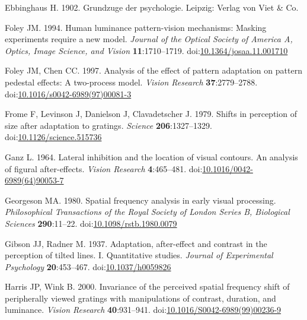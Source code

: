 \documentclass[
]{article}
\newlength{\cslhangindent}
\newlength{\cslentryspacingunit} %
\newenvironment{CSLReferences}[2] %
 {%
  \setlength{\parindent}{0pt}
  \ifodd #1
  \let\oldpar\par
  \def\par{\hangindent=\cslhangindent\oldpar}
  \fi
  \setlength{\parskip}{#2\cslentryspacingunit}
 }%
 {}
\begin{document}
\begin{CSLReferences}{1}{0}
\leavevmode{}%
Ebbinghaus H. 1902. Grundzuge der psychologie. Leipzig: Verlag von Viet \& Co.

\leavevmode{}%
Foley JM. 1994. Human luminance pattern-vision mechanisms: Masking experiments require a new model. \emph{Journal of the Optical Society of America A, Optics, Image Science, and Vision} \textbf{11}:1710--1719. doi:\href{https://doi.org/10.1364/josaa.11.001710}{10.1364/josaa.11.001710}

\leavevmode{}%
Foley JM, Chen CC. 1997. Analysis of the effect of pattern adaptation on pattern pedestal effects: A two-process model. \emph{Vision Research} \textbf{37}:2779--2788. doi:\href{https://doi.org/10.1016/s0042-6989(97)00081-3}{10.1016/s0042-6989(97)00081-3}

\leavevmode{}%
Frome F, Levinson J, Danielson J, Clavadetscher J. 1979. Shifts in perception of size after adaptation to gratings. \emph{Science} \textbf{206}:1327--1329. doi:\href{https://doi.org/10.1126/science.515736}{10.1126/science.515736}

\leavevmode{}%
Ganz L. 1964. Lateral inhibition and the location of visual contours. An analysis of figural after-effects. \emph{Vision Research} \textbf{4}:465--481. doi:\href{https://doi.org/10.1016/0042-6989(64)90053-7}{10.1016/0042-6989(64)90053-7}

\leavevmode{}%
Georgeson MA. 1980. Spatial frequency analysis in early visual processing. \emph{Philosophical Transactions of the Royal Society of London Series B, Biological Sciences} \textbf{290}:11--22. doi:\href{https://doi.org/10.1098/rstb.1980.0079}{10.1098/rstb.1980.0079}

\leavevmode{}%
Gibson JJ, Radner M. 1937. Adaptation, after-effect and contrast in the perception of tilted lines. I. Quantitative studies. \emph{Journal of Experimental Psychology} \textbf{20}:453--467. doi:\href{https://doi.org/10.1037/h0059826}{10.1037/h0059826}

\leavevmode{}%
Harris JP, Wink B. 2000. Invariance of the perceived spatial frequency shift of peripherally viewed gratings with manipulations of contrast, duration, and luminance. \emph{Vision Research} \textbf{40}:931--941. doi:\href{https://doi.org/10.1016/S0042-6989(99)00236-9}{10.1016/S0042-6989(99)00236-9}


\end{CSLReferences}
\end{document}
